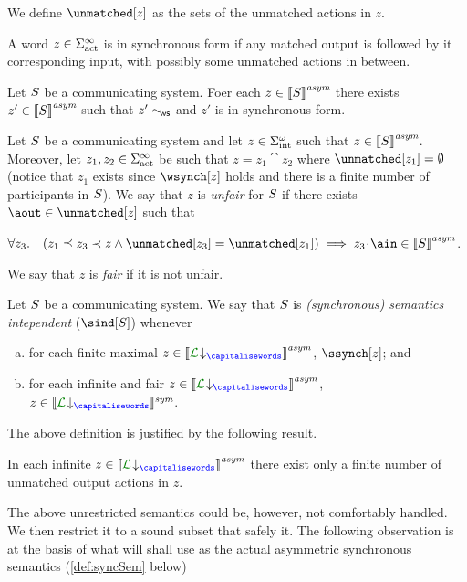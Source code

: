We define $\unmatched[z]$ as the sets of the unmatched actions in $z$. 

A word $z\in\Sigma_{\text{act}}^\infty$ is in synchronous form if any matched output is followed by
it corresponding input, with possibly some unmatched actions in between.

\begin{lemma}
Let $S$ be a communicating system. Foer each $z\in{\llbracket S\rrbracket}^{\textit{asym}}$ there exists
$z'\in{\llbracket S\rrbracket}^{\textit{asym}}$ such that $z'\sim_{\!\mathsf{ws}}$ and $z'$ is in synchronous form. 
\end{lemma}

\begin{definition}
Let $S$ be a communicating system and let $z\in\Sigma_{\text{int}}^\omega$ such that $z\in{\llbracket S\rrbracket}^{\textit{asym}}$.
Moreover, let $z_1, z_2\in\Sigma_{\text{act}}^\infty$ be such that $z=z_1\cat z_2$ where $\unmatched[z_1]=\emptyset$
(notice that $z_1$ exists since $\wsynch[z]$ holds and
there is a finite number of participants in $S$).
We say that $z$ is {\em unfair} for $S$ if there exists 
$\aout\in\unmatched[z]$ such that\\
\centerline{
$\forall z_3.\quad (z_1\preceq z_3\prec z \land \unmatched[z_3]=\unmatched[z_1])  \implies z_3\cat\ain\in\asem{\aCS}$.} 
We say that $z$ is {\em fair} if it is not unfair. 
\end{definition}


\begin{definition}
\label{def:semind}
Let $S$ be a communicating system. We say that $S$ is {\em (synchronous) semantics intependent}
 ($\sind[\aCS]$) whenever
\begin{enumerate}[a)]
\item
for each finite  maximal $z\in \asem{\proj{\clang}{}}$, $\ssynch[z]$; and
\item
for each infinite and fair $z\in \asem{\proj{\clang}{}}$,  $z\in \ssem{\proj{\clang}{}}$.
\end{enumerate}
\end{definition}

The above definition is justified by the following result.

\begin{proposition}
In each infinite $z\in \asem{\proj{\clang}{}}$ there exist only a finite number of unmatched output
actions in $z$. 
\end{proposition}





The above unrestricted semantics could be, however, not comfortably handled.
We then restrict it to a sound subset that safely  it. 
The following observation is at the basis of what will shall use as the 
actual asymmetric synchronous semantics (\cref{def:syncSem} below)

